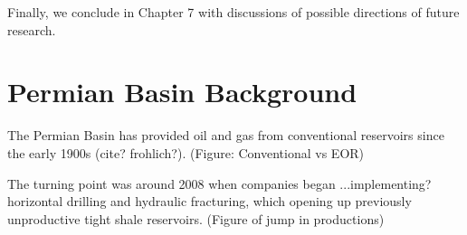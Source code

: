 \documentclass{utexasthesis}
\begin{document}
Finally, we conclude in Chapter 7 with discussions of possible directions of future research.




%
%
%
%
%
%
%
%



\chapter{Permian Basin Background}
\label{CHAP:2}




The Permian Basin has provided oil and gas from conventional reservoirs since the early 1900s (cite? frohlich?).
(Figure: Conventional vs EOR)

The turning point was around 2008 when companies began ...implementing? horizontal drilling and hydraulic fracturing, which opening up previously unproductive tight shale reservoirs.
(Figure of jump in productions)

\end{document}
